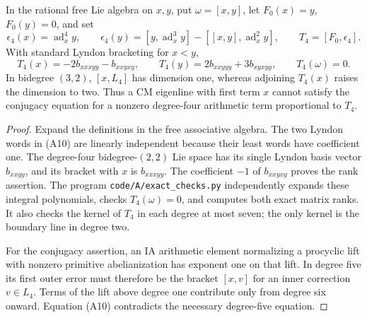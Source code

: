 \begin{proposition}
\label{A:cm-degree-five}
In the rational free Lie algebra on $x,y$, put
$\omega=[x,y]$, let $F_0(x)=y$, $F_0(y)=0$, and set
\[
 \epsilon_4(x)=\operatorname{ad}_x^4y,\qquad
 \epsilon_4(y)=[y,\operatorname{ad}_x^3y]
                 -[[x,y],\operatorname{ad}_x^2y],
 \qquad T_4=[F_0,\epsilon_4].
\]
With standard Lyndon bracketing for $x<y$,
\[
 T_4(x)=-2b_{xxxyy}-b_{xxyxy},\qquad
 T_4(y)=2b_{xxyyy}+3b_{xyxyy},\qquad T_4(\omega)=0.
                                                               \tag{A10}
\]
In bidegree $(3,2)$, $[x,L_4]$ has dimension one,
whereas adjoining $T_4(x)$ raises the dimension to
two.  Thus a CM eigenline with first term $x$
cannot satisfy the conjugacy equation for a
nonzero degree-four arithmetic term proportional
to $T_4$.
\end{proposition}
\begin{proof}
Expand the definitions in the free associative
algebra.  The two Lyndon words in (A10) are
linearly independent because their least words
have coefficient one.  The degree-four
bidegree-$(2,2)$ Lie space has its single
Lyndon basis vector $b_{xxyy}$, and its bracket
with $x$ is $b_{xxxyy}$.  The coefficient
$-1$ of $b_{xxyxy}$ proves the rank assertion.
The program \texttt{code/A/exact\_checks.py}
independently expands these integral polynomials,
checks $T_4(\omega)=0$, and computes both exact
matrix ranks.  It also checks the kernel of
$T_4$ in each degree at most seven; the only
kernel is the boundary line in degree two.

For the conjugacy assertion, an IA arithmetic
element normalizing a procyclic lift with
nonzero primitive abelianization has exponent
one on that lift.  In degree five its first
outer error must therefore be the bracket
$[x,v]$ for an inner correction $v\in L_4$.
Terms of the lift above degree one contribute
only from degree six onward.  Equation (A10)
contradicts the necessary degree-five equation.
\end{proof}

